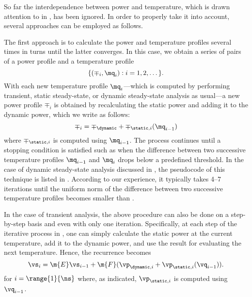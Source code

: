 So far the interdependence between power and temperature, which is drawn
attention to in , has been ignored. In order to properly take
it into account, several approaches can be employed as follows.

The first approach is to calculate the power and temperature profiles several
times in turns until the latter converges. In this case, we obtain a series of
pairs of a power profile and a temperature profile
\[
  \{ (\mp_i, \mq_i): i = 1, 2, \dots \}.
\]
With each new temperature profile $\mq_i$---which is computed by performing
transient, static steady-state, or dynamic steady-state analysis as usual---a
new power profile $\mp_i$ is obtained by recalculating the static power and
adding it to the dynamic power, which we write as follows:
\[
  \mp_i = \mp_\dynamic + \mp_{\static, i}(\mq_{i - 1})
\]
where $\mp_{\static, i}$ is computed using $\mq_{i - 1}$. The process continues
until a stopping condition is satisfied such as when the difference between two
successive temperature profiles $\mq_{i - 1}$ and $\mq_i$ drops below a
predefined threshold. In the case of dynamic steady-state analysis discussed in
, the pseudocode of this technique is listed
in . According to our experience, it
typically takes 4--7 iterations until the uniform norm of the difference between
two successive temperature profiles becomes smaller than .

In the case of transient analysis, the above procedure can also be done on a
step-by-step basis and even with only one iteration. Specifically, at each step
of the iterative process in , one can simply
calculate the static power at the current temperature, add it to the dynamic
power, and use the result for evaluating the next temperature. Hence, the
recurrence becomes
\[
  \vs_i = \m{E} \vs_{i - 1} + \m{F} (\vp_{\dynamic, i} + \vp_{\static, i}(\vq_{i - 1})).
\]
for $i = \range{1}{\ns}$ where, as indicated, $\vp_{\static, i}$ is computed
using $\vq_{i - 1}$.

